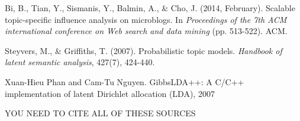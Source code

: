 \documentclass[a4paper]{article}
\begin{document}
\begin{thebibliography}{9}
Bi, B., Tian, Y., Sismanis, Y., Balmin, A., \& Cho, J. (2014, February). Scalable topic-specific influence analysis on microblogs. In \textit{Proceedings of the 7th ACM international conference on Web search and data mining} (pp. 513-522). ACM.

Steyvers, M., \& Griffiths, T. (2007). Probabilistic topic models. \textit{Handbook of latent semantic analysis}, 427(7), 424-440.

Xuan-Hieu Phan and Cam-Tu Nguyen. GibbsLDA++: A C/C++ implementation of latent Dirichlet allocation (LDA), 2007

YOU NEED TO CITE ALL OF THESE SOURCES

\end{thebibliography}
\end{document}
